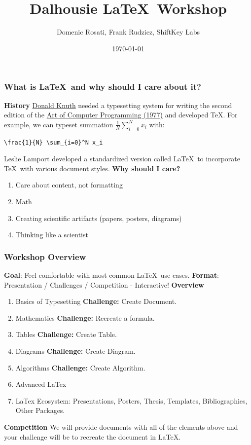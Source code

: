 \documentclass{beamer}
\title{Dalhousie \LaTeX \ Workshop} %
\author{Domenic Rosati, Frank Rudzicz, ShiftKey Labs}
\institute{Dalhousie University}
\date{\today}
\begin{document}
\frame{\titlepage}

\begin{frame}[fragile]
\frametitle{What is \LaTeX \ and why should I care about it?}

\textbf{History}
\href{https://www-cs-faculty.stanford.edu/~knuth/}{Donald Knuth} needed a typesetting system for writing the second edition of the \href{https://www-cs-faculty.stanford.edu/~knuth/taocp.html}{Art of Computer Programming (1977)} and developed \TeX. For example, we can typeset  summation $\frac{1}{N} \sum_{i=0}^N x_i$ with:
\\
\begin{verbatim}
\frac{1}{N} \sum_{i=0}^N x_i
\end{verbatim}
Leslie Lamport developed a standardized version called \LaTeX\ to incorporate \TeX \ with various document styles.
\vfill
\textbf{Why should I care?}
\begin{enumerate}
    \item Care about content, not formatting
    \item Math
    \item Creating scientific artifacts (papers, posters, diagrams)
    \item Thinking like a scientist
\end{enumerate}
\end{frame}
\begin{frame}
\frametitle{Workshop Overview}


\textbf{Goal}: Feel comfortable with most common \LaTeX \ use cases.
\vfill
\textbf{Format}: Presentation / Challenges / Competition - Interactive!
\vfill
\textbf{Overview}
\begin{enumerate}
    \item Basics of Typesetting \hfill \textbf{Challenge:} Create Document.
    \item Mathematics \hfill \textbf{Challenge:} Recreate a formula.
    \item Tables \hfill \textbf{Challenge:} Create Table.
    \item Diagrams \hfill \textbf{Challenge:} Create Diagram.
     \item Algorithms \hfill \textbf{Challenge:} Create Algorithm.
    \item Advanced LaTex
    \item LaTex Ecosystem: Presentations, Posters, Thesis, Templates, Bibliographies, Other Packages.
\end{enumerate}
\vfill
\textbf{Competition}
We will provide documents with all of the elements above and your challenge will be to recreate the document in \LaTeX.
\end{frame}
\end{document}
